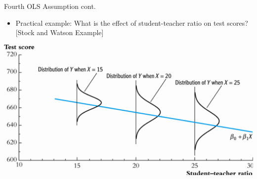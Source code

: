 \documentclass[
  8pt,
  ignorenonframetext,
  dvipsnames]{beamer}
\providecommand{\tightlist}{%
  \setlength{\itemsep}{0pt}\setlength{\parskip}{0pt}}
\let\olditem\item
\renewcommand{\item}{%
  \olditem\vspace{4pt}
}
\begin{document}
\begin{frame}{Fourth OLS Assumption cont.}
\protect\hypertarget{fourth-ols-assumption-cont.-1}{}

\begin{itemize}
\tightlist
\item
  Practical example: What is the effect of student-teacher ratio on test
  scores? {[}Stock and Watson Example{]}
\end{itemize}

\includegraphics{heteroskedasticity_str.png}

\end{frame}
\end{document}
